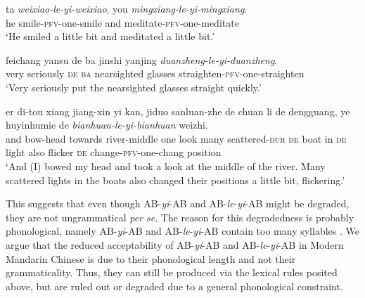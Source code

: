 \documentclass[11pt,a4paper,fleqn,draft]{article}
\let\textbf\emph
\begin{document}
 \ex\label{ex:AByiAB-rou2}
 \gll ta \textbf{weixiao-le-yi-weixiao}, you \textbf{mingxiang-le-yi-mingxiang}.\footnotemark\\
 he smile-\textsc{pfv}-one-smile and meditate-\textsc{pfv}-one-meditate\\
 \glt `He smiled a little bit and meditated a little bit.'
 
 \ex\label{ex:AByiAB-li}
 \gll feichang yansu de ba jinshi yanjing \textbf{duanzheng-le-yi-duanzheng}.\footnotemark\\
 very seriously \textsc{de} \textsc{ba} nearsighted glasses straighten-\textsc{pfv}-one-straighten\\
 \glt `Very seriously put the nearsighted glasses straight quickly.'
 
 \ex\label{ex:ABleyiAB-ccl}
 \gll er di-tou xiang jiang-xin yi kan, jiduo sanluan-zhe de chuan li de dengguang, ye huyinhumie de \textbf{bianhuan-le-yi-bianhuan} weizhi.\\
  and bow-head towards river-middle one look many scattered-\textsc{dur} \textsc{de} boat in \textsc{de} light also flicker \textsc{de} change-\textsc{pfv}-one-chang position\\ 
 \glt `And (I) bowed my head and took a look at the middle of the river. Many scattered lights in the boats also changed their positions a little bit, flickering.'
 \z
\z

This suggests that  even though AB-\emph{yi}-AB and AB-\emph{le}-\emph{yi}-AB might be degraded, they are not ungrammatical \emph{per se}.
The reason for this degradedness is probably phonological, namely  AB-\emph{yi}-AB and AB-\emph{le}-\emph{yi}-AB contain too many syllables \citetext{\citealp[274]{Fan1964}, \citealp[143]{Sui2018}, \citealp[239]{YangWei2017}, \citealp[15]{Zhang2000}}.
We argue that  the reduced acceptability of AB-\emph{yi}-AB and AB\hyp{}\emph{le}\hyp{}\emph{yi}\hyp{}AB in Modern Mandarin Chinese is due to their phonological length and not their grammaticality.
Thus, they can still be produced via the lexical rules posited above, but are ruled out or degraded due to a general phonological constraint.
\end{document}
